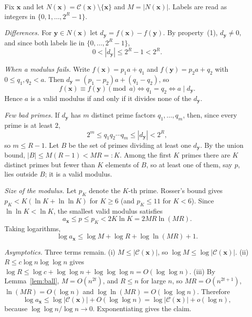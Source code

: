 \documentclass[journal,10pt]{IEEEtran}
\newcommand{\step}[1]{\par\smallskip\noindent\emph{#1}\enspace}
\newcommand{\C}{\mathcal{C}}
\newcommand{\bx}{\mathbf{x}}
\newcommand{\by}{\mathbf{y}}
\begin{document}
\begin{IEEEproof}
Fix $\bx$ and let $N(\bx)=\C(\bx)\setminus\{\bx\}$ and $M=|N(\bx)|$. Labels are read as integers in $\{0,1,\dots,2^R-1\}$.

\step{Differences.} For $\by\in N(\bx)$ let $d_{\by}=f(\bx)-f(\by)$. By property~(1), $d_{\by}\neq0$, and since both labels lie in $\{0,\dots,2^R-1\}$,
\[
0<|d_{\by}|\le 2^R-1<2^R .
\]

\step{When a modulus fails.} Write $f(\bx)=p_1a+q_1$ and $f(\by)=p_2a+q_2$ with $0\le q_1,q_2<a$. Then $d_{\by}=(p_1-p_2)a+(q_1-q_2)$, so
\[
f(\bx)\equiv f(\by)\pmod a\iff q_1=q_2\iff a\mid d_{\by}.
\]
Hence $a$ is a valid modulus if and only if it divides none of the $d_{\by}$.

\step{Few bad primes.} If $d_{\by}$ has $m$ distinct prime factors $q_1,\dots,q_m$, then, since every prime is at least $2$,
\[
2^m\le q_1q_2\cdots q_m\le|d_{\by}|<2^R,
\]
so $m\le R-1$. Let $B$ be the set of primes dividing at least one $d_{\by}$. By the union bound, $|B|\le M(R-1)<MR=:K$. Among the first $K$ primes there are $K$ distinct primes but fewer than $K$ elements of $B$, so at least one of them, say $p$, lies outside $B$; it is a valid modulus.

\step{Size of the modulus.} Let $p_K$ denote the $K$-th prime. Rosser's bound gives $p_K<K(\ln K+\ln\ln K)$ for $K\ge6$ (and $p_K\le11$ for $K<6$). Since $\ln\ln K<\ln K$, the smallest valid modulus satisfies
\[
a_{\bx}\le p\le p_K<2K\ln K=2MR\ln(MR).
\]
Taking logarithms,
\[
\log a_{\bx}\le\log M+\log R+\log\ln(MR)+1 .
\]

\step{Asymptotics.} Three terms remain. (i) $M\le|\C(\bx)|$, so $\log M\le\log|\C(\bx)|$. (ii) $R\le c\log n\log\log n$ gives $\log R\le\log c+\log\log n+\log\log\log n=O(\log\log n)$. (iii) By Lemma~\ref{lem:ball}, $M=O(n^{2t})$, and $R\le n$ for large $n$, so $MR=O(n^{2t+1})$, $\ln(MR)=O(\log n)$ and $\log\ln(MR)=O(\log\log n)$. Therefore
\[
\log a_{\bx}\le\log|\C(\bx)|+O(\log\log n)=\log|\C(\bx)|+o(\log n),
\]
because $\log\log n/\log n\to0$. Exponentiating gives the claim.
\end{IEEEproof}
\end{document}
